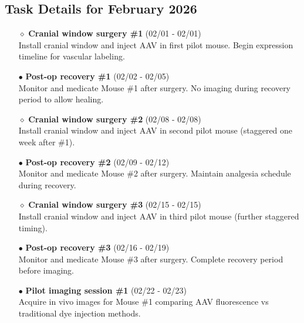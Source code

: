 \documentclass[landscape,a4paper]{article}
\begin{document}
\vspace{0.5cm}
\subsection{Task Details for February 2026}
\begin{itemize}[leftmargin=1cm]
    \item[\textcolor{other}{$\diamond$}] \textbf{Cranial window surgery \#1} (02/01 - 02/01)\\ Install cranial window and inject AAV in first pilot mouse. Begin expression timeline for vascular labeling.
    \item[\textcolor{other}{$\bullet$}] \textbf{Post-op recovery \#1} (02/02 - 02/05)\\ Monitor and medicate Mouse \#1 after surgery. No imaging during recovery period to allow healing.
    \item[\textcolor{other}{$\diamond$}] \textbf{Cranial window surgery \#2} (02/08 - 02/08)\\ Install cranial window and inject AAV in second pilot mouse (staggered one week after \#1).
    \item[\textcolor{other}{$\bullet$}] \textbf{Post-op recovery \#2} (02/09 - 02/12)\\ Monitor and medicate Mouse \#2 after surgery. Maintain analgesia schedule during recovery.
    \item[\textcolor{other}{$\diamond$}] \textbf{Cranial window surgery \#3} (02/15 - 02/15)\\ Install cranial window and inject AAV in third pilot mouse (further staggered timing).
    \item[\textcolor{other}{$\bullet$}] \textbf{Post-op recovery \#3} (02/16 - 02/19)\\ Monitor and medicate Mouse \#3 after surgery. Complete recovery period before imaging.
    \item[\textcolor{other}{$\bullet$}] \textbf{Pilot imaging session \#1} (02/22 - 02/23)\\ Acquire in vivo images for Mouse \#1 comparing AAV fluorescence vs traditional dye injection methods.
\end{itemize}
\end{document}
